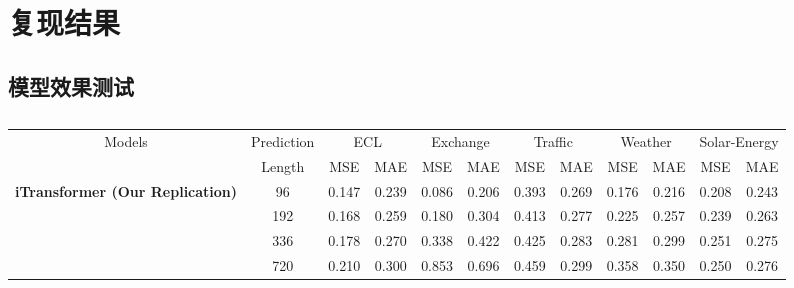 \documentclass[twoside,12pt]{article}
\begin{document}
\section{复现结果}
\subsection{模型效果测试}
\begin{table}[htbp]
  \caption{}
  \label{tab:ablation}
  \vspace{5pt}
  \centering
  \resizebox{\textwidth}{!}
  {
    \begin{small}
      \renewcommand{\multirowsetup}{\centering}
      \setlength{\tabcolsep}{5.3pt}
      \begin{tabular}{c|c|cc|cc|cc|cc|cc}
        \toprule
        \multirow{2}{*}{Models}                                  & Prediction & \multicolumn{2}{c|}{ECL} & \multicolumn{2}{c|}{Exchange} & \multicolumn{2}{c|}{Traffic} & \multicolumn{2}{c|}{Weather} & \multicolumn{2}{c}{Solar-Energy}                                         \\
        \cmidrule(lr){3-4} \cmidrule(lr){5-6} \cmidrule(lr){7-8} \cmidrule(lr){9-10} \cmidrule(lr){11-12}
                                                                 & Length     & MSE                      & MAE                           & MSE                          & MAE                          & MSE                              & MAE   & MSE   & MAE   & MSE   & MAE   \\
        \midrule
        \multirow{5}{*}{\textbf{iTransformer (Our Replication)}} & 96         & 0.147                    & 0.239                         & 0.086                        & 0.206                        & 0.393                            & 0.269 & 0.176 & 0.216 & 0.208 & 0.243 \\
                                                                 & 192        & 0.168                    & 0.259                         & 0.180                        & 0.304                        & 0.413                            & 0.277 & 0.225 & 0.257 & 0.239 & 0.263 \\
                                                                 & 336        & 0.178                    & 0.270                         & 0.338                        & 0.422                        & 0.425                            & 0.283 & 0.281 & 0.299 & 0.251 & 0.275 \\
                                                                 & 720        & 0.210                    & 0.300                         & 0.853                        & 0.696                        & 0.459                            & 0.299 & 0.358 & 0.350 & 0.250 & 0.276 \\

\end{tabular}
\end{small}}
\end{table}
\end{document}
